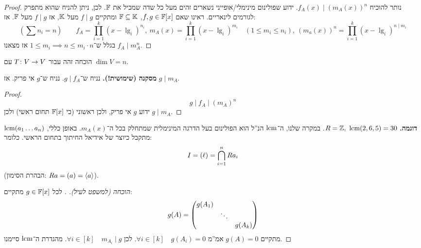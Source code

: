 \documentclass[]{../../../../tex/classes/styledArticle}
\begin{document}
    \begin{proof}
        נותר להוכיח $f_A(x) \mid (m_A(x))^{n}$. ידוע שפולינום מינימלי/אופייני נשארים זהים מעל כל שדה שמכיל את $\mathbb{F}$. לכן, ניתן להניח שהוא מתפרק לגורמים לינאריים. ראינו שאם $f, g \in \mathbb{F}[x]$, $\mathbb{F} \subseteq \mathbb{K}$ ומתקיים $f \mid g$ מעל $\mathbb{K}$, אז $f \mid g$ מעל $\mathbb{F}$. אז: 
        \[ (\sum n_i = n) \quad\quad f_A = \prod_{i = 1}^{k}(x - \lg_i)^{n_i}, \ m_A(x) = \prod_{i = 1}^{k}(x - \lg_i)^{m_i} \quad (1 \le m_i \le n_i), \ (m_a(x))^{n} = \prod_{i = 1}^{k}(x - \lg_i)^{n \mid m_i} \]
        בגלל ש־$1 \le m_i \implies n \le m_i \cdot n$ אז מצאנו $f_A\mid m_A^{n}$. 
    \end{proof}
    הוכחה זהה עבור $T \colon V \to V$ עם $\dim V = n$. 
    
    \textbf{מסקנה (שימושית!). }נניח ש־$g \mid f_A$. נניח ש־$g$ אי פריק. אז $g \mid m_A$. \begin{proof}
        \[ g \mid f_A \mid (m_A)^{n} \]
        ידוע $g$ אי פריק, ולכן ראשוני (כי $\mathbb{F}[x]$ תחום ראשי) ולכן $g \mid m_A$. 
    \end{proof}
    \textbf{דוגמה. }$R = \mathbb{Z}, \ \operatorname{lcm}(2, 6, 5) = 30$. 
    במקרה שלנו, ה־$\operatorname{lcm}$ הנ''ל הוא הפולינום בעל הדרגה המינימלית שמתחלק בכל ה־$m_A(x)$. באופן כללי, $\operatorname{lcm}(a_1 \dots a_n)$ מתקבל כיוצר של אידיאל החיתוך בתחום הראשי. כלומר: 
    \[ I = (\ell) = \bigcap_{i = 1}^{n}R a_i \]
    (הבהרת הסימון: $ Ra = (a) = \langle a \rangle $). 
    \begin{proof}[הוכחה (למשפט לעיל). ]
        לכל $g \in \mathbb{F}[x]$ מתקיים: 
        \[ g(A) = \begin{pmatrix} g(A_1) & & \\ & \ddots & \\ && g(A_k) \end{pmatrix} \]
        מתקיים $g(A) = 0$ אמ''מ $\forall i \in [k] \quad g(A_i) =0$. לכן $\forall i \in [k] \quad m_{A_i} \mid g$. מהגדרת ה־$\operatorname{lcm}$ סיימנו. 
    \end{proof}
    
\end{document}
